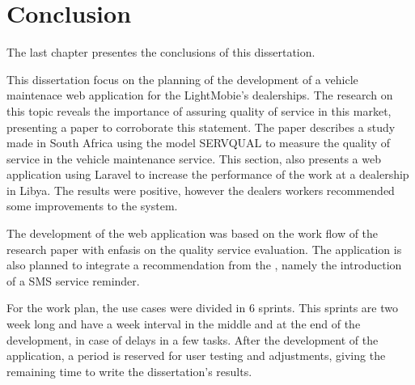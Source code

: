 \chapter{Conclusion}%
\label{chapter:conclusion}

\begin{introduction}
The last chapter presentes the conclusions of this dissertation.
\end{introduction} 


This dissertation focus on the planning of the development of a vehicle maintenace web application for the LightMobie's dealerships. 
The research on this topic reveals the importance of assuring quality of service in this market, presenting a paper to corroborate this statement.
The paper describes a study made in South Africa using the model SERVQUAL to measure the quality of service in the vehicle maintenance service.
This section, also presents a web application using Laravel to increase the performance of the work at a dealership in Libya. 
The results were positive, however the dealers workers recommended some improvements to the system.

The development of the web application was based on the work flow of the research paper with enfasis on the quality service evaluation.
The application is also planned to integrate a recommendation from the \citet{MAS_MOTORS}, namely the introduction of a SMS service reminder. 

For the work plan, the use cases were divided in 6 sprints. 
This sprints are two week long and have a week interval in the middle and at the end of the development, in case of delays in a few tasks.
After the development of the application, a period is reserved for user testing and adjustments, giving the remaining time to write the dissertation's results.

